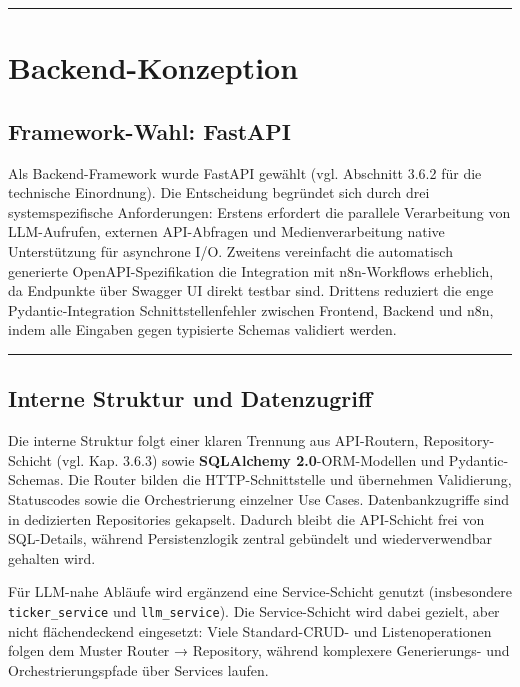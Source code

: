 \begin{center}\rule{0.5\linewidth}{0.5pt}\end{center}

\section{Backend-Konzeption}\label{backend-konzeption}

\subsection{Framework-Wahl: FastAPI}\label{framework-wahl-fastapi}

Als Backend-Framework wurde FastAPI gewählt (vgl. Abschnitt 3.6.2 für
die technische Einordnung). Die Entscheidung begründet sich durch drei
systemspezifische Anforderungen: Erstens erfordert die parallele
Verarbeitung von LLM-Aufrufen, externen API-Abfragen und
Medienverarbeitung native Unterstützung für asynchrone I/O. Zweitens
vereinfacht die automatisch generierte OpenAPI-Spezifikation die
Integration mit n8n-Workflows erheblich, da Endpunkte über Swagger UI
direkt testbar sind. Drittens reduziert die enge Pydantic-Integration
Schnittstellenfehler zwischen Frontend, Backend und n8n, indem alle
Eingaben gegen typisierte Schemas validiert werden.

\begin{center}\rule{0.5\linewidth}{0.5pt}\end{center}

\subsection{Interne Struktur und
Datenzugriff}\label{interne-struktur-und-datenzugriff}

Die interne Struktur folgt einer klaren Trennung aus API-Routern,
Repository-Schicht (vgl. Kap. 3.6.3) sowie \textbf{SQLAlchemy
2.0}-ORM-Modellen und Pydantic-Schemas. Die Router bilden die
HTTP-Schnittstelle und übernehmen Validierung, Statuscodes sowie die
Orchestrierung einzelner Use Cases. Datenbankzugriffe sind in
dedizierten Repositories gekapselt. Dadurch bleibt die API-Schicht frei
von SQL-Details, während Persistenzlogik zentral gebündelt und
wiederverwendbar gehalten wird.

Für LLM-nahe Abläufe wird ergänzend eine Service-Schicht genutzt
(insbesondere \texttt{ticker\_service} und \texttt{llm\_service}). Die
Service-Schicht wird dabei gezielt, aber nicht flächendeckend
eingesetzt: Viele Standard-CRUD- und Listenoperationen folgen dem Muster
Router → Repository, während komplexere Generierungs- und
Orchestrierungspfade über Services laufen.

